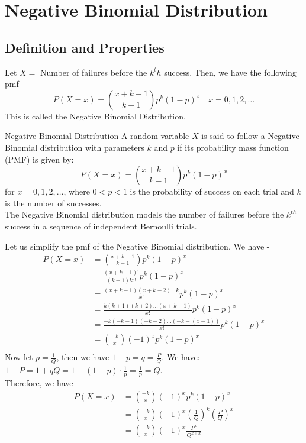\documentclass[openany]{book}
\begin{document}
\section{Negative Binomial Distribution}
\subsection{Definition and Properties}
Let $X =$ Number of failures before the $k^th$ success. Then, we have the following pmf -
$$P(X = x) = \binom{x+k-1}{k-1} p^k (1-p)^x \quad x = 0, 1, 2, \ldots$$
This is called the Negative Binomial Distribution.
\begin{mydefinition}{Negative Binomial Distribution}
    A random variable $X$ is said to follow a Negative Binomial distribution with parameters $k$ and $p$ if its probability mass function (PMF) is given by:
    $$P(X = x) = \binom{x+k-1}{k-1} p^k (1-p)^x$$
    for $x = 0, 1, 2, \ldots$, where $0 < p < 1$ is the probability of success on each trial and $k$ is the number of successes. \\
    The Negative Binomial distribution models the number of failures before the $k^{th}$ success in a sequence of independent Bernoulli trials.
\end{mydefinition}
Let us simplify the pmf of the Negative Binomial distribution. We have -
\begin{align*}
    P(X = x) &= \binom{x+k-1}{k-1} p^k (1-p)^x \\
    &= \frac{(x+k-1)!}{(k-1)! x!} p^k (1-p)^x \\
    &= \frac{(x+k-1)(x+k-2) \ldots k}{x!} p^k (1-p)^x \\
    &= \frac{k(k+1)(k+2) \ldots (x+k-1)}{x!} p^k (1-p)^x \\
    &= \frac{-k(-k-1)(-k-2) \ldots (-k-(x-1))}{x!} p^k (1-p)^x \\
    &= \binom{-k}{x} (-1)^x p^k (1-p)^x \\
\end{align*}
Now let $p = \frac{1}{Q}$, then we have $1 - p = q = \frac{P}{Q}$. We have: \\
$1 + P = 1 + qQ = 1 + (1 - p) \cdot \frac{1}{p} = \frac{1}{p} = Q$. \\
Therefore, we have -
\begin{align*}
    P(X = x) &= \binom{-k}{x} (-1)^x p^k (1-p)^x \\
    &= \binom{-k}{x} (-1)^x \left(\frac{1}{Q}\right)^k \left(\frac{P}{Q}\right)^x \\
    &= \binom{-k}{x} (-1)^x \frac{P^x}{Q^{k+x}} \\
\end{align*}
\end{document}
